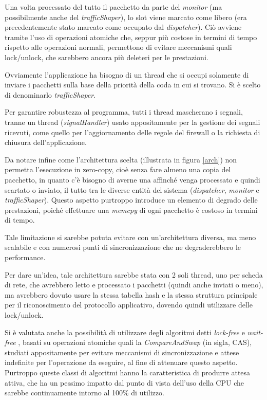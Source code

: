 Una volta processato del tutto il pacchetto da parte del \emph{monitor} (ma possibilmente anche del \emph{trafficShaper}), lo slot viene marcato come libero (era precedentemente stato marcato come occupato dal \emph{dispatcher}). Ciò avviene tramite l'uso di operazioni atomiche che, seppur più costose in termini di tempo rispetto alle operazioni normali, permettono di evitare meccanismi quali lock/unlock, che sarebbero ancora più deleteri per le prestazioni.

Ovviamente l'applicazione ha bisogno di un thread che si occupi solamente di inviare i pacchetti sulla base della priorità della coda in cui si trovano. Si è scelto di denominarlo \emph{trafficShaper}.

Per garantire robustezza al programma, tutti i thread mascherano i segnali, tranne un thread (\emph{signalHandler}) usato appositamente per la gestione dei segnali ricevuti, come quello per l'aggiornamento delle regole del firewall o la richiesta di chiusura dell'applicazione.

Da notare infine come l'architettura scelta (illustrata in figura \ref{arch}) non permetta l'esecuzione in zero-copy, cioè senza fare almeno una copia del pacchetto, in quanto c'è bisogno di averne una affinché venga processato e quindi scartato o inviato, il tutto tra le diverse entità del sistema (\emph{dispatcher}, \emph{monitor} e \emph{trafficShaper}). Questo aspetto purtroppo introduce un elemento di degrado delle prestazioni, poiché effettuare una \emph{memcpy} di ogni pacchetto è costoso in termini di tempo.

Tale limitazione si sarebbe potuta evitare con un'architettura diversa, ma meno scalabile e con numerosi punti di sincronizzazione che ne degraderebbero le performance.

Per dare un'idea, tale architettura sarebbe stata con 2 soli thread, uno per scheda di rete, che avrebbero letto e processato i pacchetti (quindi anche inviati o meno), ma avrebbero dovuto usare la stessa tabella hash e la stessa struttura principale per il riconoscimento del protocollo applicativo, dovendo quindi utilizzare delle lock/unlock.

Si è valutata anche la possibilità di utilizzare degli algoritmi detti \emph{lock-free} e \emph{wait-free} \cite{lfpdp,fwsds}, basati su operazioni atomiche quali la \emph{CompareAndSwap} (in sigla, CAS), studiati appositamente per evitare meccanismi di sincronizzazione e attese indefinite per l'operazione da eseguire, al fine di attenuare questo aspetto. Purtroppo queste classi di algoritmi hanno la caratteristica di produrre attesa attiva, che ha un pessimo impatto dal punto di vista dell'uso della CPU che sarebbe continuamente intorno al 100\% di utilizzo.

